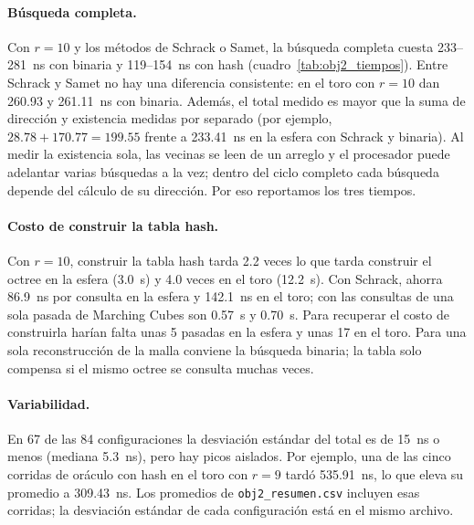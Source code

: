\paragraph{Búsqueda completa.} Con $r=10$ y los métodos de Schrack o Samet, la
búsqueda completa cuesta 233--281~ns con binaria y 119--154~ns con hash
(cuadro~\ref{tab:obj2_tiempos}). Entre Schrack y
Samet no hay una diferencia consistente: en el toro con $r=10$ dan 260.93 y
261.11~ns con binaria. Además, el total medido es mayor que la suma de dirección y
existencia medidas por separado (por ejemplo, $28.78+170.77=199.55$ frente a
233.41~ns en la esfera con Schrack y binaria). Al medir la existencia sola, las
vecinas se leen de un arreglo y el procesador puede adelantar varias búsquedas a la
vez; dentro del ciclo completo cada búsqueda depende del cálculo de su dirección.
Por eso reportamos los tres tiempos.

\paragraph{Costo de construir la tabla hash.} Con $r=10$, construir la tabla hash
tarda 2.2 veces lo que tarda construir el octree en la esfera (3.0~s) y 4.0 veces en
el toro (12.2~s). Con Schrack, ahorra 86.9~ns por consulta en la esfera y 142.1~ns en el
toro; con las consultas de una sola pasada de Marching Cubes son 0.57~s y 0.70~s.
Para recuperar el costo de construirla harían falta unas 5 pasadas en la esfera y
unas 17 en el toro. Para una sola reconstrucción de la malla conviene la búsqueda
binaria; la tabla solo compensa si el mismo octree se consulta muchas veces.

\paragraph{Variabilidad.} En 67 de las 84 configuraciones la desviación estándar del
total es de 15~ns o menos (mediana 5.3~ns), pero hay picos aislados. Por ejemplo, una de las cinco
corridas de oráculo con hash en el toro con $r=9$ tardó 535.91~ns, lo que eleva su
promedio a 309.43~ns. Los promedios de \texttt{obj2\_resumen.csv} incluyen esas
corridas; la desviación estándar de cada configuración está en el mismo archivo.
